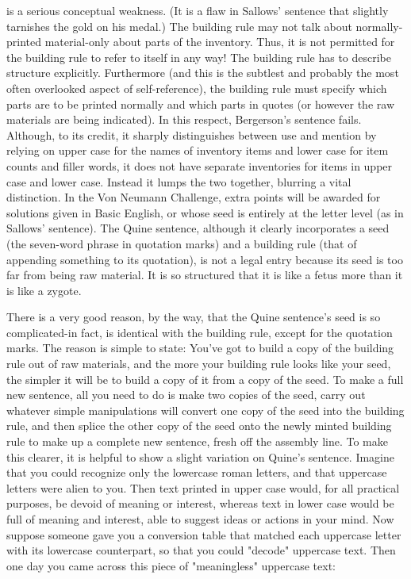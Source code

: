 is a serious conceptual weakness. (It is a flaw in Sallows' sentence that slightly tarnishes the gold on his medal.) The building rule may not talk about normally-printed material-only about parts of the inventory. Thus, it is not permitted for the building rule to refer to itself in any way! The building rule has to describe structure explicitly. Furthermore (and this is the subtlest and probably the most often overlooked aspect of self-reference), the building rule must specify which parts are to be printed normally and which parts in quotes (or however the raw materials are being indicated). In this respect, Bergerson's sentence fails. Although, to its credit, it sharply distinguishes between use and mention by relying on upper case for the names of inventory items and lower case for item counts and filler words, it does not have separate inventories for items in upper case and lower case. Instead it lumps the two together, blurring a vital distinction. In the Von Neumann Challenge, extra points will be awarded for solutions given in Basic English, or whose seed is entirely at the letter level (as in Sallows' sentence). The Quine sentence, although it clearly incorporates a seed (the seven-word phrase in quotation marks) and a building rule (that of appending something to its quotation), is not a legal entry because its seed is too far from being raw material. It is so structured that it is like a fetus more than it is like a zygote. 
\separator

There is a very good reason, by the way, that the Quine sentence's seed is so complicated-in fact, is identical with the building rule, except for the quotation marks. The reason is simple to state: You've got to build a copy of the building rule out of raw materials, and the more your building rule looks like your seed, the simpler it will be to build a copy of it from a copy of the seed. To make a full new sentence, all you need to do is make two copies of the seed, carry out whatever simple manipulations will convert one copy of the seed into the building rule, and then splice the other copy of the seed onto the newly minted building rule to make up a complete new sentence, fresh off the assembly line. To make this clearer, it is helpful to show a slight variation on Quine's sentence. Imagine that you could recognize only the lowercase roman letters, and that uppercase letters were alien to you. Then text printed in upper case would, for all practical purposes, be devoid of meaning or interest, whereas text in lower case would be full of meaning and interest, able to suggest ideas or actions in your mind. Now suppose someone gave you a conversion table that matched each uppercase letter with its lowercase counterpart, so that you could "decode" uppercase text. Then one day you came across this piece of "meaningless" uppercase text: 



